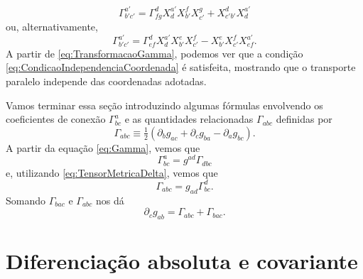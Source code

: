 \begin{equation}\label{eq:TransformacaoGamma}
	\boxed{
		\Gamma^{a'}_{b'c'} = \Gamma^d_{fg}X^{a'}_dX^f_{b'}X^g_{c'}+X^d_{c'b'}X^{a'}_d
	}
\end{equation}
ou, alternativamente,
\begin{equation}\label{eq:TransformacaoGammaAlternativa}
	\boxed{
		\Gamma^{a'}_{b'c'} = \Gamma^d_{ef}X^{a'}_dX^e_{b'}X^f_{c'}-X^e_{b'}X^f_{c'}X^{a'}_{ef} .
	}
\end{equation}
A partir de \eqref{eq:TransformacaoGamma}, podemos ver que a condição \eqref{eq:CondicaoIndependenciaCoordenada} é satisfeita, mostrando que o transporte paralelo independe das coordenadas adotadas.

Vamos terminar essa seção introduzindo algumas fórmulas envolvendo os coeficientes de conexão $\Gamma^a_{bc}$ e as quantidades relacionadas $\Gamma_{abc}$ definidas por
\begin{equation}\label{eq:ChristoffelPrimeiroTipo}
	\Gamma_{abc} \equiv \tfrac{1}{2}(\partial_bg_{ac}+\partial_c g_{ba}-\partial_a g_{bc}).
\end{equation}
A partir da equação \eqref{eq:Gamma}, vemos que
\begin{equation}\label{eq:LevantarIndiceGamma}
	\Gamma^a_{bc}=g^{ad}\Gamma_{dbc}
\end{equation}
e, utilizando \eqref{eq:TensorMetricaDelta}, vemos que
\begin{equation}\label{eq:AbaixarIndiceGamma}
	\Gamma_{abc}=g_{ad}\Gamma^d_{bc}.
\end{equation}
Somando $\Gamma_{bac}$ e $\Gamma_{abc}$ nos dá
\begin{equation}\label{eq:DerivadaMetricaGamma}
	\partial_cg_{ab}=\Gamma_{abc}+\Gamma_{bac}.
\end{equation}

\section{Diferenciação absoluta e covariante}\label{sec:DiferenciacaoAbsolutaCovariante}

